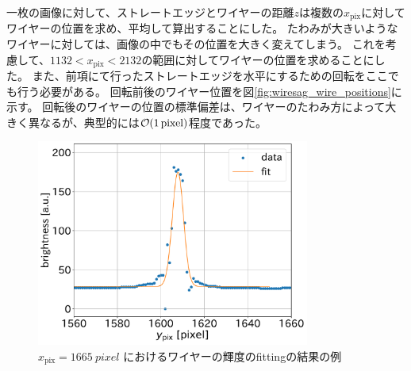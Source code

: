 \documentclass[../../main.tex]{subfiles}
\begin{document}
一枚の画像に対して、ストレートエッジとワイヤーの距離$z$は複数の$x_{\mathrm{pix}}$に対してワイヤーの位置を求め、平均して算出することにした。
たわみが大きいようなワイヤーに対しては、画像の中でもその位置を大きく変えてしまう。
これを考慮して、$1132 < x_{\mathrm{pix}} < 2132$の範囲に対してワイヤーの位置を求めることにした。
また、前項にて行ったストレートエッジを水平にするための回転をここでも行う必要がある。
回転前後のワイヤー位置を図\ref{fig:wiresag_wire_positions}に示す。
回転後のワイヤーの位置の標準偏差は、ワイヤーのたわみ方によって大きく異なるが、典型的には$\order{\SI{1}{pixel}}$程度であった。
\begin{figure}[H]
    \centering
    \includegraphics[width=0.8\textwidth]{wiresag/wiresag_wire_fit.pdf}
    \caption{$x_{\mathrm{pix}}=\SI{1665}{pixel}$ におけるワイヤーの輝度のfittingの結果の例}
    \label{fig:wiresag_wire_fit}
\end{figure}
\end{document}
